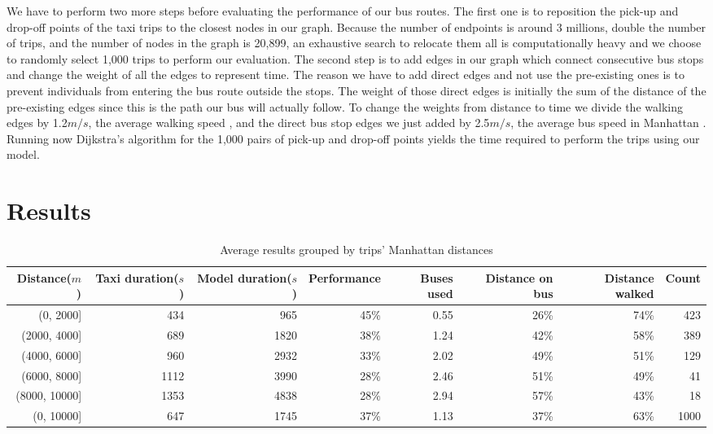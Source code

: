 \documentclass{article}
\begin{document}
We have to perform two more steps before evaluating the performance of our bus routes. The first one is to reposition the pick-up and drop-off points of the taxi trips to the closest nodes in our graph. Because the number of endpoints is around 3 millions, double the number of trips, and the number of nodes in the graph is 20,899, an exhaustive search to relocate them all is computationally heavy and we choose to randomly select 1,000 trips to perform our evaluation. The second step is to add edges in our graph which connect consecutive bus stops and change the weight of all the edges to represent time. The reason we have to add direct edges and not use the pre-existing ones is to prevent individuals from entering the bus route outside the stops. The weight of those direct edges is initially the sum of the distance of the pre-existing edges since this is the path our bus will actually follow. To change the weights from distance to time we divide the walking edges by 1.2$m/s$, the average walking speed \citep{fitzpatrick_another_2006}, and the direct bus stop edges we just added by 2.5$m/s$, the average bus speed in Manhattan \citep{stringer_bus_2017}. Running now Dijkstra's algorithm \citep{dijkstra_note_1959} for the 1,000 pairs of pick-up and drop-off points yields the time required to perform the trips using our model.

\section{Results}\label{sec:results}

\begin{table*}
	\vskip 3mm
	\begin{center}
		\begin{small}
			\begin{tabular}{rrrrrrrr}
				\hline
				\abovespace\belowspace
				Distance($m$) & Taxi duration($s$) & Model duration($s$) & Performance & Buses used & Distance on bus & Distance walked & Count \\
				\hline
				\abovespace
				(0, 2000] & 434 & 965 & 45\% & 0.55 & 26\%  & 74\% & 423\\
				(2000, 4000] & 689 & 1820 & 38\% & 1.24 & 42\% & 58\% & 389\\
				(4000, 6000] & 960 & 2932 & 33\% & 2.02 & 49\% & 51\% & 129\\
				(6000, 8000] & 1112 & 3990 & 28\% & 2.46 & 51\% & 49\% & 41\\
				(8000, 10000] & 1353 & 4838 & 28\% & 2.94 & 57\% & 43\% & 18\\
				\hline
				\abovespace
				(0, 10000] & 647 & 1745 & 37\% & 1.13 & 37\% & 63\% & 1000\\
				\hline
			\end{tabular}
		\end{small}
		\caption{Average results grouped by trips' Manhattan distances}
		\label{tab:bus_vs_taxi}
	\end{center}
	\vskip -3mm
\end{table*}
\end{document}
